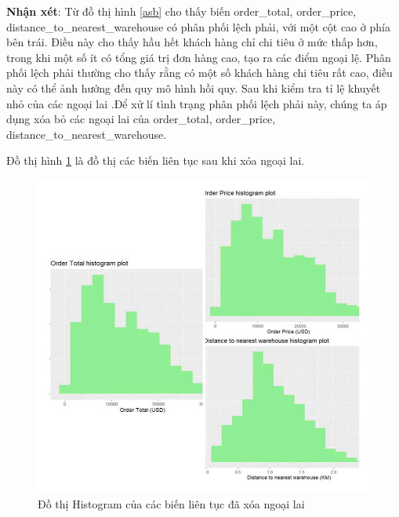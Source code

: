 \textbf{Nhận xét}: Từ đồ thị hình \ref{asb} cho thấy biến order\_total, order\_price, distance\_to\_nearest\_warehouse có phân phối lệch phải, với một cột cao ở phía bên trái. Điều này cho thấy hầu hết khách hàng chỉ chi tiêu ở mức thấp hơn, trong khi một số ít có tổng giá trị đơn hàng cao, tạo ra các điểm ngoại lệ. Phân phối lệch phải thường cho thấy  rằng có một số khách hàng chi tiêu rất cao, điều này có thể ảnh hưởng đến quy mô hình hồi quy. Sau khi kiểm tra tỉ lệ khuyết nhỏ của các ngoại lai .Để xử lí tình trạng phân phối lệch phải này, chúng ta áp dụng xóa bỏ các ngoại lai  của order\_total, order\_price, distance\_to\_nearest\_warehouse.


 Đồ thị hình \ref{abs} là đồ thị các biến liên tục sau khi xóa ngoại lai.
 \begin{figure}[H]
    \centering
    \includegraphics[width=0.7\linewidth]{graphics/bang8.jpg}
    \caption{Đồ thị Histogram của các biến liên tục đã xóa ngoại lai}
    \label{abs}
\end{figure}
